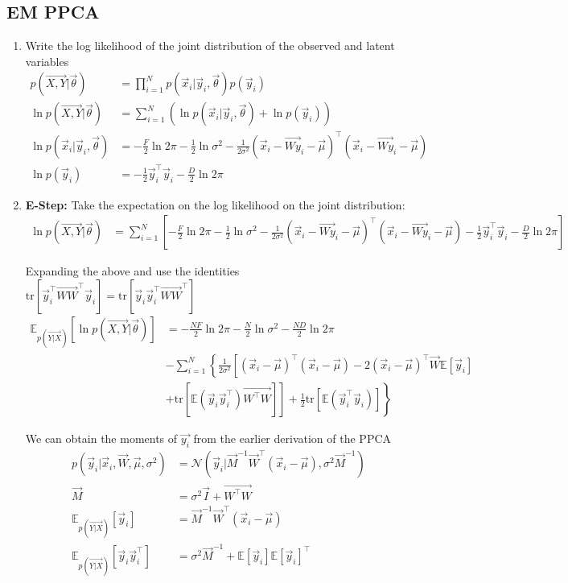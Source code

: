 \documentclass[12pt,twoside]{article}
\begin{document}
\subsection{EM PPCA}
\begin{enumerate}
\item Write the log likelihood of the joint distribution of the observed and latent variables
\begin{align*}
p(\vec{X,Y} \vert \vec{\theta}) &= \prod_{i=1}^N p(\vec{x}_i \vert\vec{y}_i, \vec{\theta})p(\vec{y}_i)\\
\ln p(\vec{X,Y} \vert \vec{\theta}) &= \sum_{i=1}^N \left(\ln p(\vec{x}_i \vert\vec{y}_i,\vec{\theta})+ \ln p(\vec{y}_i)\right)\\
\ln p(\vec{x}_i \vert \vec{y}_i, \vec{\theta}) &= -\frac{F}{2}\ln 2\pi -\frac{1}{2}\ln\sigma^2 - \frac{1}{2\sigma^2}(\vec{x}_i-\vec{Wy}_i-\vec{\mu})^\top (\vec{x}_i-\vec{Wy}_i-\vec{\mu})\\
\ln p(\vec{y}_i)&= -\frac{1}{2}\vec{y}_i^\top \vec{y}_i-\frac{D}{2}\ln 2\pi
\end{align*}

\item \textbf{E-Step:} Take the expectation on the log likelihood on the joint distribution:
\begin{align*}
\ln p(\vec{X,Y} \vert \vec{\theta}) &=\sum_{i=1}^N\left[-\frac{F}{2}\ln 2\pi-\frac{1}{2}\ln\sigma^2 -\frac{1}{2\sigma^2}(\vec{x}_i-\vec{Wy}_i-\vec{\mu})^\top (\vec{x}_i-\vec{Wy}_i-\vec{\mu}) -\frac{1}{2}\vec{y}_i^\top\vec{y}_i-\frac{D}{2}\ln 2\pi\right]
\end{align*}

Expanding the above and use the identities $\text{tr}\left[\vec{y}_i^\top \vec{WW}^\top \vec{y}_i\right]=\text{tr}\left[\vec{y}_i\vec{y}_i^\top \vec{WW}^\top \right]$
\begin{align*}
\mathbb{E}_{p(\vec{Y\vert X})} [\ln p(\vec{X,Y} \vert \vec{\theta})]
&=-\frac{NF}{2}\ln 2\pi - \frac{N}{2}\ln\sigma^2 -\frac{ND}{2}\ln 2\pi\\
& -\sum_{i=1}^N\left\lbrace\frac{1}{2\sigma^2}\left[(\vec{x}_i-\vec{\mu})^\top (\vec{x}_i-\vec{\mu}) -2 (\vec{x}_i-\vec{\mu})^\top \vec{W} \mathbb{E}[\vec{y}_i] \right.\right.\\
&+\left.\left.\text{tr}\left[\mathbb{E}(\vec{y}_i\vec{y}_i^\top)\vec{W^\top W}\right]\right]+\frac{1}{2}\text{tr}\left[\mathbb{E}(\vec{y}_i^\top \vec{y}_i)\right]\right\rbrace
\end{align*}

We can obtain the moments of $\vec{y_i}$ from the earlier derivation of the PPCA
\begin{align*}
p(\vec{y}_i\vert \vec{x}_i, \vec{W}, \vec{\mu}, \sigma^2) & = \mathcal{N}(\vec{y}_i \vert \vec{M}^{-1}\vec{W}^\top(\vec{x}_i-\vec{\mu}), \sigma^2\vec{M}^{-1})\\
\vec{M}&=\sigma^2\vec{I} + \vec{W^\top W}\\
\mathbb{E}_{p(\vec{Y\vert X})}[\vec{y}_i]&=\vec{M}^{-1}\vec{W}^\top(\vec{x}_i-\vec{\mu})\\
\mathbb{E}_{p(\vec{Y\vert X})}[\vec{y}_i \vec{y}_i^\top]&=\sigma^2\vec{M}^{-1} +\mathbb{E}[\vec{y}_i]\mathbb{E}[\vec{y}_i]^\top
\end{align*}


\end{enumerate}
\end{document}
